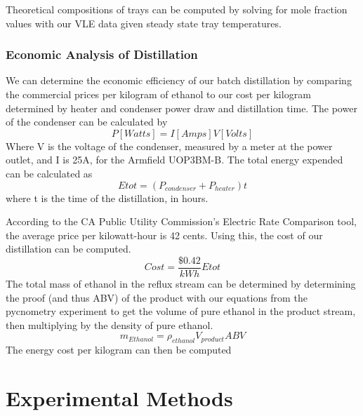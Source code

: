 \documentclass[lettersize,journal]{IEEEtran}
\begin{document}
	Theoretical compositions of trays can be computed by solving for mole fraction values with our VLE data given steady state tray temperatures.
	\subsubsection{Economic Analysis of Distillation}
	We can determine the economic efficiency of our batch distillation by comparing the commercial prices per kilogram of ethanol to our cost per kilogram determined by heater and condenser power draw and distillation time.
	The power of the condenser can be calculated by
	\begin{equation}
		\label{deqn_ex5.5}
		P [Watts] = I[Amps]V[Volts]
	\end{equation}
	Where V is the voltage of the condenser, measured by a meter at the power outlet, and I is 25A, for the Armfield UOP3BM-B.
	The total energy expended can be calculated as
	\begin{equation}
		\label{deqn_ex5.5}
		E {tot} = (P_{condenser} + P_{heater})t
	\end{equation}
	where t is the time of the distillation, in hours.
	
	According to the CA Public Utility Commission's Electric Rate Comparison tool, the average price per kilowatt-hour is 42 cents. Using this, the cost of our distillation can be computed.
	\begin{equation}
		\label{deqn_ex5.5}
		Cost= \frac{\$0.42}{kWh}E {tot} 
	\end{equation}
	The total mass of ethanol in the reflux stream can be determined by determining the proof (and thus ABV) of the product with our equations from the pycnometry experiment to get the volume of pure ethanol in the product stream, then multiplying by the density of pure ethanol.
	\begin{equation}
		\label{deqn_ex5.5}
		m_{Ethanol}= \rho_{ethanol}V_{product}ABV
	\end{equation}
	The energy cost per kilogram can then be computed
	
	\section{Experimental Methods}
\end{document}
